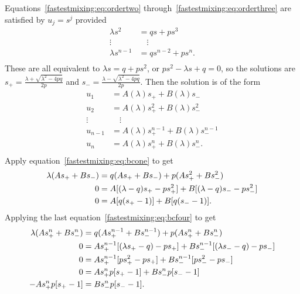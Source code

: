 \documentclass[12pt]{article}
\begin{document}
\begin{solution}
    Equations~\eqref{fastestmixing:eq:ordertwo} through~\eqref{fastestmixing:eq:orderthree}
    are satisfied by \( u_j = s^j \) provided
    \begin{align*}
        \lambda s^2 &= q s + p s^3 \\
        \vdots &\quad \vdots \\
        \lambda s^{n-1} &= q s^{n-2} + p s^n.  \\
    \end{align*}
    These are all equivalent to \( \lambda s = q + p s^2 \), or \( p s^2
    - \lambda s + q = 0 \), so the solutions are \( s_{+} = \frac{\lambda
    + \sqrt{\lambda^2 - 4pq}}{2p} \) and \( s_{-} = \frac{\lambda -
    \sqrt{\lambda^2 - 4pq}}{2p} \). Then the solution is of the form
    \begin{align*}
        u_1 &= A(\lambda) s_{+} + B(\lambda) s_{-} \\
        u_2 &= A(\lambda) s_{+}^2 + B(\lambda) s_{-}^2 \\
        \vdots &\quad \vdots \\
        u_{n-1} &= A(\lambda) s_{+}^{n-1} + B(\lambda) s_{-}^{n-1} \\
        u_n &= A(\lambda) s_{+}^n + B(\lambda) s_{-}^n.  \\
    \end{align*}
    Apply equation~\eqref{fastestmixing:eq:bcone} to get
    \begin{align}
        \lambda (A s_{+} + B s_{-} ) &= q(A s_{+} + B s_{-}) + p(A s_{+}^2
        + B s_{-}^2 ) \notag \\
        0 &= A[(\lambda-q)s_{+} - p s_{+}^2] + B[(\lambda-q)s_{-} - p s_
        {-}^2] \notag \\
        0 &= A[q(s_{+} - 1)] + B[q(s_{-} -1)].%
        \label{fastestmixing:eq:leftrelation}
    \end{align}
    Applying the last equation~\eqref{fastestmixing:eq:bcfour} to get
    \begin{align}
        \lambda (A s_{+}^{n} + B s_{-}^{n} ) &= q(A s_{+}^{n-1} + B s_{-}^
        {n-1}) + p(A s_{+}^n + B s_{-}^n) \notag \\
        0 &= A s_{+}^{n-1} [(\lambda s_{+} - q) - p s_{+}] + B s_{-}^{n-1}
        [(\lambda s_{-}- q) - p s_{-}] \notag \\
        0 &= A s_{+}^{n-1} [p s_{+}^2 - p s_{+}] + B s_{-}^{n-1} [p s_{-}^2
        - p s_{-}] \notag \\
        0 &= A s_{+}^n p [s_{+} - 1] + B s_{-}^n p [s_{-} - 1]%
        \label{fastestmixing:eq:bcrelation} \\
        - A s_{+}^n p [ s_{+} - 1] &= B s_{-}^n p[ s_{-} - 1].
    \end{align}


\end{solution}
\end{document}
